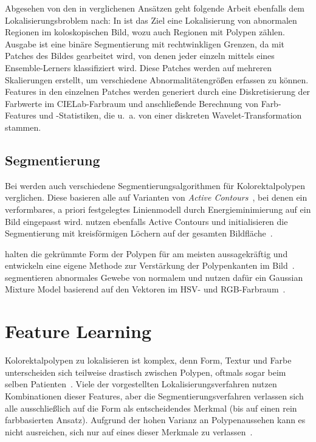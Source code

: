 Abgesehen von den in \cite{Prasath.2016} verglichenen Ansätzen geht folgende Arbeit ebenfalls dem Lokalisierungsbroblem nach:
In \cite{Li.2004} ist das Ziel eine Lokalisierung von abnormalen Regionen im koloskopischen Bild, wozu auch Regionen mit Polypen zählen.
Ausgabe ist eine binäre Segmentierung mit rechtwinkligen Grenzen, da mit Patches des Bildes gearbeitet wird, von denen jeder einzeln mittels eines Ensemble-Lerners klassifiziert wird.
Diese Patches werden auf mehreren Skalierungen erstellt, um verschiedene Abnormalitätengrößen erfassen zu können.
Features in den einzelnen Patches werden generiert durch eine Diskretisierung der Farbwerte im CIELab-Farbraum und anschließende Berechnung von Farb-Features und -Statistiken, die u.~a. von einer diskreten Wavelet-Transformation stammen.



\subsection{Segmentierung}

Bei \cite{Prasath.2016} werden auch verschiedene Segmentierungsalgorithmen für Kolorektalpolypen verglichen.
Diese basieren alle auf Varianten von \emph{Active Contours}~\cite{Kass.1988}, bei denen ein verformbares, a priori festgelegtes Linienmodell durch Energieminimierung auf ein Bild eingepasst wird.
\citeauthor{Sasmal.2018} nutzen ebenfalls Active Contours und initialisieren die Segmentierung mit kreisförmigen Löchern auf der gesamten Bildfläche~\cite{Sasmal.2018}.

\citeauthor{Ionescu.2013} halten die gekrümmte Form der Polypen für am meisten aussagekräftig und entwickeln eine eigene Methode zur Verstärkung der Polypenkanten im Bild~\cite{Ionescu.2013}.
\citeauthor{Vieira.2012} segmentieren abnormales Gewebe von normalem und nutzen dafür ein Gaussian Mixture Model basierend auf den Vektoren im HSV- und RGB-Farbraum~\cite{Vieira.2012}.




\section{Feature Learning}

Kolorektalpolypen zu lokalisieren ist komplex, denn Form, Textur und Farbe unterscheiden sich teilweise drastisch zwischen Polypen, oftmals sogar beim selben Patienten~\cite{Prasath.2016}.
Viele der vorgestellten Lokalisierungsverfahren nutzen Kombinationen dieser Features, aber die Segmentierungsverfahren verlassen sich alle ausschließlich auf die Form als entscheidendes Merkmal (bis auf einen rein farbbasierten Ansatz).
Aufgrund der hohen Varianz an Polypenaussehen kann es nicht ausreichen, sich nur auf eines dieser Merkmale zu verlassen~\cite{Prasath.2016}.

